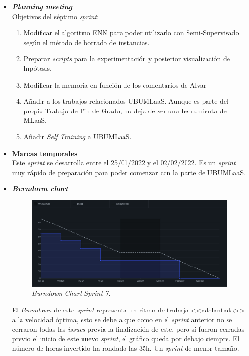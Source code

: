 \begin{itemize}
\item \textbf{\textit{Planning meeting}}\\
Objetivos del séptimo \textit{sprint}:
\begin{enumerate}
\item Modificar el algoritmo ENN para poder utilizarlo con Semi-Supervisado según el método de borrado de instancias.
\item Preparar \textit{scripts} para la experimentación y posterior visualización de hipótesis.
\item Modificar la memoria en función de los comentarios de Alvar.
\item Añadir a los trabajos relacionados UBUMLaaS. Aunque es parte del propio Trabajo de Fin de Grado, no deja de ser una herramienta de MLaaS.
\item Añadir \textit{Self Training} a UBUMLaaS.
\end{enumerate}

\item \textbf{Marcas temporales}\\
Este \textit{sprint} se desarrolla entre el 25/01/2022 y el 02/02/2022. Es un \textit{sprint} muy rápido de preparación para poder comenzar con la parte de UBUMLaaS.

\item \textbf{\textit{Burndown chart}}\\
\begin{figure}
\begin{center}
\includegraphics[width=\textwidth]{../img/anexos/sprints/BD-Sprint7}
\caption{\textit{Burndown Chart Sprint 7.}}\label{fig:BD-Sprint7}
\end{center}
\end{figure}
El \textit{Burndown} de este \textit{sprint} representa un ritmo de trabajo <<adelantado>> a la velocidad óptima, esto se debe a que como en el \textit{sprint} anterior no se cerraron todas las \textit{issues} previa la finalización de este, pero sí fueron cerradas previo el inicio de este nuevo \textit{sprint}, el gráfico queda por debajo siempre. El número de horas invertido ha rondado las 35h. Un \textit{sprint} de menor tamaño.


\end{itemize}
